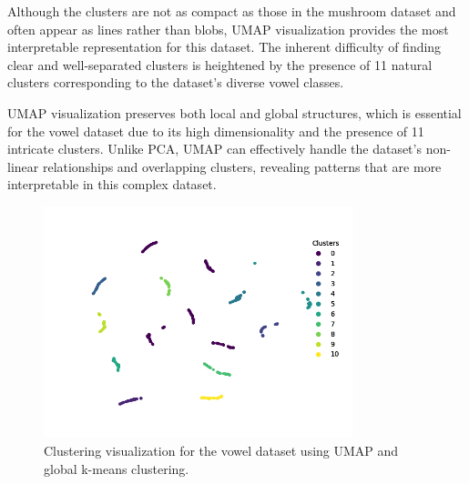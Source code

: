 Although the clusters are not as compact as those in the mushroom dataset and often appear as lines rather than blobs, UMAP visualization provides the most interpretable representation for this dataset. The inherent difficulty of finding clear and well-separated clusters is heightened by the presence of 11 natural clusters corresponding to the dataset's diverse vowel classes.

UMAP visualization preserves both local and global structures, which is essential for the vowel dataset due to its high dimensionality and the presence of 11 intricate clusters. Unlike PCA, UMAP can effectively handle the dataset's non-linear relationships and overlapping clusters, revealing patterns that are more interpretable in this complex dataset.

\begin{figure}[h!]
    \centering
    \includegraphics[width=0.8\textwidth]{figures/visualizations/umap_n_components=11,kernel=rbf,gamma=1,n_clusters=11,max_iterations=100,tolerance=0.0001,random_state=4.png}
    \caption{Clustering visualization for the vowel dataset using UMAP and global k-means clustering.}
    \label{fig:vowel_clustering}
\end{figure}
